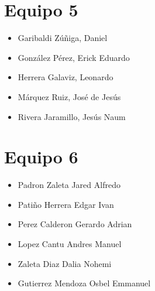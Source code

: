 \documentclass[11pt, a4paper, oneside]{book}
\begin{document}
\section*{Equipo 5}
\begin{itemize}
    \item Garibaldi Zúñiga, Daniel
    \item González Pérez, Erick Eduardo
    \item Herrera Galaviz, Leonardo
    \item Márquez Ruiz, José de Jesús
    \item Rivera Jaramillo, Jesús Naum
\end{itemize}

\section*{Equipo 6}
\begin{itemize}
    \item Padron Zaleta Jared Alfredo
    \item Patiño Herrera Edgar Ivan
    \item Perez Calderon Gerardo Adrian
    \item Lopez Cantu Andres Manuel
    \item Zaleta Diaz Dalia Nohemi
    \item Gutierrez Mendoza Osbel Emmanuel
\end{itemize}
\end{document}
